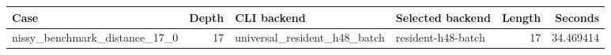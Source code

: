 {\small
\begin{tabular}{lrllrr}
\hline
Case & Depth & CLI backend & Selected backend & Length & Seconds \\
\hline
nissy\_benchmark\_distance\_17\_0 & 17 & universal\_resident\_h48\_batch & resident-h48-batch & 17 & 34.469414 \\
\hline
\end{tabular}
}
